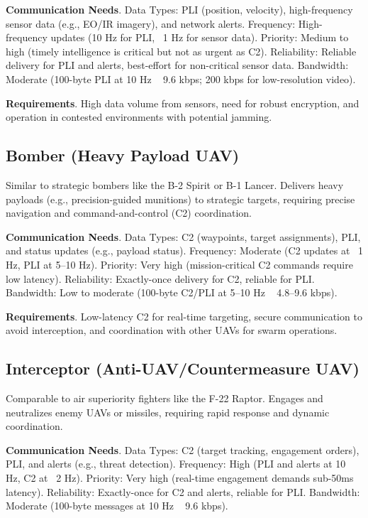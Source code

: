 \documentclass{article}
\begin{document}
\textbf{Communication Needs}.
Data Types: PLI (position, velocity), high-frequency sensor data (e.g., EO/IR imagery), and network alerts.
Frequency: High-frequency updates (10 Hz for PLI, ~1 Hz for sensor data).
Priority: Medium to high (timely intelligence is critical but not as urgent as C2).
Reliability: Reliable delivery for PLI and alerts, best-effort for non-critical sensor data.
Bandwidth: Moderate (100-byte PLI at 10 Hz ~ 9.6 kbps; 200 kbps for low-resolution video).

\textbf{Requirements}.
High data volume from sensors, need for robust encryption,
and operation in contested environments with potential jamming.

\subsection{Bomber (Heavy Payload UAV)}
Similar to strategic bombers like the B-2 Spirit or B-1 Lancer.
Delivers heavy payloads (e.g., precision-guided munitions) to strategic targets,
requiring precise navigation and command-and-control (C2) coordination.

\textbf{Communication Needs}.
Data Types: C2 (waypoints, target assignments), PLI, and status updates (e.g., payload status).
Frequency: Moderate (C2 updates at ~1 Hz, PLI at 5–10 Hz).
Priority: Very high (mission-critical C2 commands require low latency).
Reliability: Exactly-once delivery for C2, reliable for PLI.
Bandwidth: Low to moderate (100-byte C2/PLI at 5–10 Hz ~ 4.8–9.6 kbps).

\textbf{Requirements}.
Low-latency C2 for real-time targeting, secure communication to avoid interception,
and coordination with other UAVs for swarm operations.

\newpage
\subsection{Interceptor (Anti-UAV/Countermeasure UAV)}
Comparable to air superiority fighters like the F-22 Raptor.
Engages and neutralizes enemy UAVs or missiles, requiring rapid response and dynamic coordination.

\textbf{Communication Needs}.
Data Types: C2 (target tracking, engagement orders), PLI, and alerts (e.g., threat detection).
Frequency: High (PLI and alerts at 10 Hz, C2 at ~2 Hz).
Priority: Very high (real-time engagement demands sub-50ms latency).
Reliability: Exactly-once for C2 and alerts, reliable for PLI.
Bandwidth: Moderate (100-byte messages at 10 Hz ~ 9.6 kbps).
\end{document}
